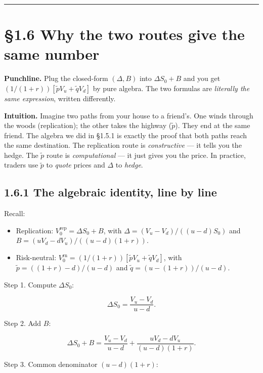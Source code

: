 \documentclass[
  10pt,
  twoside]{book}
\providecommand{\tightlist}{%
  \setlength{\itemsep}{0pt}\setlength{\parskip}{0pt}}
\begin{document}
\begin{center}\rule{0.5\linewidth}{0.5pt}\end{center}

\section{§1.6 Why the two routes give the same
number}\label{why-the-two-routes-give-the-same-number}

\textbf{Punchline.} Plug the closed-form \((\Delta,B)\) into
\(\Delta S_0+B\) and you get \((1/(1+r))[\tilde p V_u + \tilde q V_d]\)
by pure algebra. The two formulas are \emph{literally the same
expression}, written differently.

\textbf{Intuition.} Imagine two paths from your house to a friend's. One
winds through the woods (replication); the other takes the highway
(\(\tilde p\)). They end at the same friend. The algebra we did in
§1.5.1 is exactly the proof that both paths reach the same destination.
The replication route is \emph{constructive} --- it tells you the hedge.
The \(\tilde p\) route is \emph{computational} --- it just gives you the
price. In practice, traders use \(\tilde p\) to \emph{quote} prices and
\(\Delta\) to \emph{hedge}.

\subsection{1.6.1 The algebraic identity, line by
line}\label{the-algebraic-identity-line-by-line}

Recall:

\begin{itemize}
\tightlist
\item
  Replication: \(V_0^{\text{rep}} = \Delta S_0 + B\), with
  \(\Delta = (V_u-V_d)/((u-d)S_0)\) and
  \(B = (uV_d-dV_u)/((u-d)(1+r))\).
\item
  Risk-neutral:
  \(V_0^{\text{rn}} = (1/(1+r))[\tilde p V_u + \tilde q V_d]\), with
  \(\tilde p = ((1+r)-d)/(u-d)\) and \(\tilde q = (u-(1+r))/(u-d)\).
\end{itemize}

Step 1. Compute \(\Delta S_0\):

\[\Delta S_0 = \frac{V_u - V_d}{u-d}.\]

Step 2. Add \(B\):

\[\Delta S_0 + B = \frac{V_u-V_d}{u-d} + \frac{uV_d-dV_u}{(u-d)(1+r)}.\]

Step 3. Common denominator \((u-d)(1+r)\):
\end{document}

